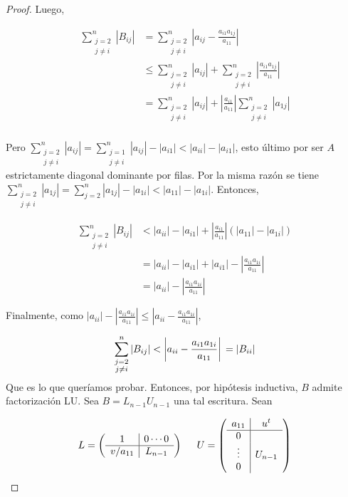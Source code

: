 \begin{propo}
\begin{proof}
Luego,

\begin{align*}
\sum_{\substack{j = 2\\ j \neq i}}^n |B_{ij}| & = \sum_{\substack{j = 2\\ j \neq i}}^n \left|a_{ij} - \frac{a_{i1}a_{1j}}{a_{11}}\right|\\
& \leq \sum_{\substack{j = 2\\ j \neq i}}^n |a_{ij}| + \sum_{\substack{j = 2\\ j \neq i}}^n \left|\frac{a_{i1}a_{1j}}{a_{11}}\right|\\
& = \sum_{\substack{j = 2\\ j \neq i}}^n |a_{ij}| + \left|\frac{a_{i1}}{a_{11}}\right| \sum_{\substack{j = 2\\ j \neq i}}^n \left|a_{1j}\right|\\
\end{align*}

Pero $\sum_{\substack{j = 2\\ j \neq i}}^n |a_{ij}| = \sum_{\substack{j = 1\\ j \neq i}}^n |a_{ij}| - |a_{i1}| < |a_{ii}| - |a_{i1}|$, esto último por ser $A$ estrictamente diagonal dominante por filas. Por la misma razón se tiene $\sum_{\substack{j = 2\\ j \neq i}}^n |a_{1j}| = \sum_{j = 2}^n |a_{1j}| - |a_{1i}| < |a_{11}| - |a_{1i}|$. Entonces,

\begin{align*}
\sum_{\substack{j = 2\\ j \neq i}}^n |B_{ij}| & < |a_{ii}| - |a_{i1}| + \left|\frac{a_{i1}}{a_{11}}\right|(|a_{11}| - |a_{1i}|)\\
& = |a_{ii}| - |a_{i1}| + |a_{i1}| - \left|\frac{a_{i1} a_{1i}}{a_{11}}\right|\\
& = |a_{ii}| - \left|\frac{a_{i1} a_{1i}}{a_{11}}\right|
\end{align*}

Finalmente, como $|a_{ii}| - \left|\frac{a_{i1} a_{1i}}{a_{11}}\right| \leq \left|a_{ii} - \frac{a_{i1} a_{1i}}{a_{11}}\right|$,

\[\sum_{\substack{j = 2\\ j \neq i}}^n |B_{ij}| < \left|a_{ii} - \frac{a_{i1} a_{1i}}{a_{11}}\right|\\
= |B_{ii}|\]
Que es lo que queríamos probar. Entonces, por hipótesis inductiva, $B$ admite factorización LU. Sea $B = L_{n - 1} U_{n - 1}$ una tal escritura. Sean

\[L = \left(\begin{array}{c|c}
1 & 0 \cdots 0\\ \hline
v / a_{11} & L_{n - 1}
\end{array}\right)
\hspace{0.5cm}
U = \left(\begin{array}{c|c}
a_{11} & u^t\\ \hline
0 & \\
\vdots & U_{n - 1}\\
0 &
\end{array}\right)
\]


\end{proof}
\end{propo}
